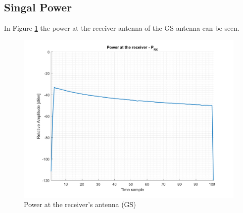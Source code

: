 \subsection*{Singal Power}
In Figure \ref{fig:s2_power} the power at the receiver antenna of the GS antenna can be seen.

\begin{figure}[H]
	\centering
	\includegraphics[scale=0.8]{figures/s2_power.png}
	\caption{Power at the receiver's antenna (GS)}
	\label{fig:s2_power}
\end{figure}

